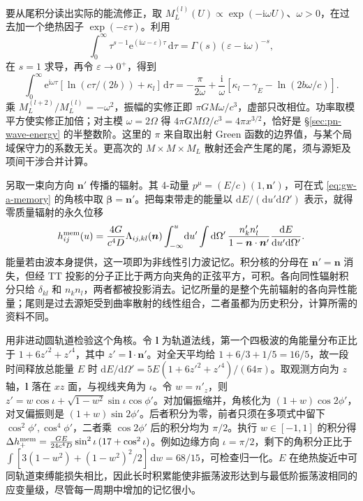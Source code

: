 要从尾积分读出实际的能流修正，取 $M_L^{(l)}(U)\propto\exp(-\mathrm i\omega U)$、$\omega>0$，在过去加一个绝热因子 $\exp(-\varepsilon\tau)$。利用
\[
 \int_0^\infty \tau^{s-1}\mathrm e^{(\mathrm i\omega-\varepsilon)\tau}\,\mathrm d\tau
     =\Gamma(s)(\varepsilon-\mathrm i\omega)^{-s},
\]
在 $s=1$ 求导，再令 $\varepsilon\to0^+$，得到
\[
 \int_0^\infty\mathrm e^{\mathrm i\omega\tau}
     [\ln(c\tau/(2b))+\kappa_l]\,\mathrm d\tau
 =-\frac{\pi}{2\omega}
 +\frac{\mathrm i}{\omega}[\kappa_l-\gamma_E-\ln(2b\omega/c)] .
\]
乘 $M_L^{(l+2)}/M_L^{(l)}=-\omega^2$，振幅的实修正即 $\pi GM\omega/c^3$，虚部只改相位。功率取模平方使实修正加倍；对主模 $\omega=2\Omega$ 得 $4\pi GM\Omega/c^3=4\pi x^{3/2}$，恰好是 \S\ref{sec:pn-wave-energy} 的半整数阶。这里的 $\pi$ 来自取出射 Green 函数的边界值，与某个局域保守力的系数无关。更高次的 $M\times M\times M_L$ 散射还会产生尾的尾，须与源矩及项间干涉合并计算。

另取一束向方向 $\bm n'$ 传播的辐射。其 4-动量 $p^\mu=(E/c)(1,\bm n')$，可在式 \eqref{eq:gw-a-memory} 的角核中取 $\bm\beta=\bm n'$。把每束带走的能量以 $\mathrm dE/(\mathrm du'\mathrm d\Omega')$ 表示，就得零质量辐射的永久位移
\begin{equation}
 h_{ij}^{\rm mem}(u)=\frac{4G}{c^4D}\Lambda_{ij,kl}(\bm n)
   \int_{-\infty}^u\!\mathrm du'\int\mathrm d\Omega'\,
   \frac{n'_k n'_l}{1-\bm n\cdot\bm n'}
                 \frac{\mathrm dE}{\mathrm du'\mathrm d\Omega'} .
 \label{eq:gw-a-nonlinearmem}
\end{equation}
能量若由波本身提供，这一项即为非线性引力波记忆。积分核的分母在 $\bm n'=\bm n$ 消失，但经 TT 投影的分子正比于两方向夹角的正弦平方，可积。各向同性辐射积分只给 $\delta_{kl}$ 和 $n_kn_l$，两者都被投影消去。记忆所量的是整个先前辐射的各向异性能量；尾则是过去源矩受到曲率散射的线性组合，二者虽都为历史积分，计算所需的资料不同。

用非进动圆轨道检验这个角核。令 $\bm l$ 为轨道法线，第一个四极波的角能量分布正比于 $1+6z'^2+z'^4$，其中 $z'=\bm l\cdot\bm n'$。对全天平均给 $1+6/3+1/5=16/5$，故一段时间释放总能量 $E$ 时 $\mathrm dE/\mathrm d\Omega'=5E(1+6z'^2+z'^4)/(64\pi)$。取观测方向为 $z$ 轴，$\bm l$ 落在 $xz$ 面，与视线夹角为 $\iota$。令 $w=n'_z$，则 $z'=w\cos\iota+\sqrt{1-w^2}\sin\iota\cos\phi'$。对加偏振缩并，角核化为 $(1+w)\cos2\phi'$，对叉偏振则是 $(1+w)\sin2\phi'$。后者积分为零，前者只须在多项式中留下 $\cos^2\phi',\cos^4\phi'$，二者乘 $\cos2\phi'$ 后的积分均为 $\pi/2$。执行 $w\in[-1,1]$ 的积分得 $\Delta h_+^{\rm mem}=\frac{GE}{24c^4D}\sin^2\iota\,(17+\cos^2\iota)$。例如边缘方向 $\iota=\pi/2$，剩下的角积分正比于 $\int[3(1-w^2)+(1-w^2)^2/2]\,\mathrm dw=68/15$，可检查归一化。$E$ 在绝热旋近中可同轨道束缚能损失相比，因此长时积累能使非振荡波形达到与最低阶振荡波相同的应变量级，尽管每一周期中增加的记忆很小。

